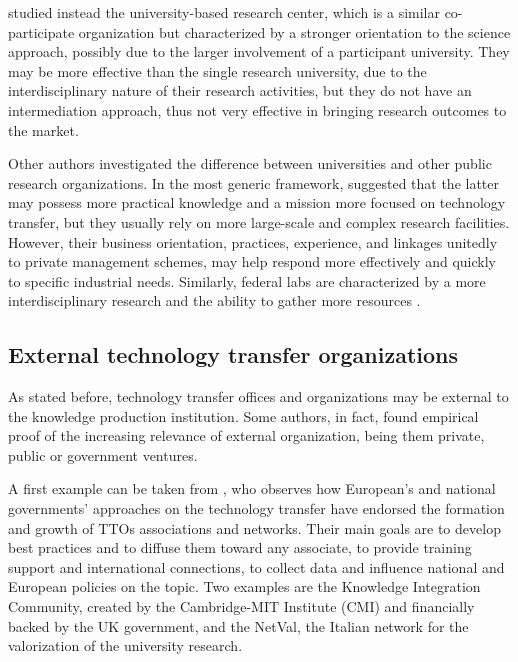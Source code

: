 \citet{Rogers2001} studied instead the university-based research center, which is a similar co-participate organization but characterized by a stronger orientation to the science approach, possibly due to the larger involvement of a participant university. They may be more effective than the single research university, due to the interdisciplinary nature of their research activities, but they do not have an intermediation approach, thus not very effective in bringing research outcomes to the market.

Other authors investigated the difference between universities and other public research organizations. In the most generic framework, \citet{Teirlinck2012} suggested that the latter may possess more practical knowledge and a mission more focused on technology transfer, but they usually rely on more large-scale and complex research facilities. However, their business orientation, practices, experience, and linkages \citep{Debackere2005} unitedly to private management schemes, may help respond more effectively and quickly to specific industrial needs. Similarly, federal labs are characterized by a more interdisciplinary research and the ability to gather more resources \citep{Bozeman2000}.

\subsection{External technology transfer organizations}

As stated before, technology transfer offices and organizations may be external to the knowledge production institution. Some authors, in fact, found empirical proof of the increasing relevance of external organization, being them private, public or government ventures.

A first example can be taken from \citet{Geuna2009}, who observes how European's and national governments' approaches on the technology transfer have endorsed the formation and growth of TTOs associations and networks. Their main goals are to develop best practices and to diffuse them toward any associate, to provide training support and international connections, to collect data and influence national and European policies on the topic. Two examples are the Knowledge Integration Community, created by the Cambridge-MIT Institute (CMI) and financially backed by the UK government, and the NetVal, the Italian network for the valorization of the university research.

